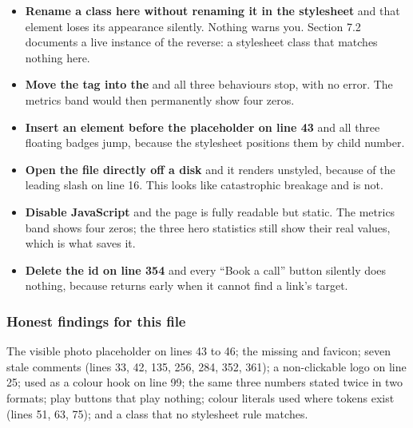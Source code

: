 \begin{itemize}
\item \textbf{Rename a class here without renaming it in the stylesheet} and that
  element loses its appearance silently. Nothing warns you. Section 7.2 documents a
  live instance of the reverse: a stylesheet class that matches nothing here.
\item \textbf{Move the  tag into the } and all three
  behaviours stop, with no error. The metrics band would then permanently show four
  zeros.
\item \textbf{Insert an element before the placeholder on line 43} and all three
  floating badges jump, because the stylesheet positions them by child number.
\item \textbf{Open the file directly off a disk} and it renders unstyled, because of
  the leading slash on line 16. This looks like catastrophic breakage and is not.
\item \textbf{Disable JavaScript} and the page is fully readable but static. The
  metrics band shows four zeros; the three hero statistics still show their real
  values, which is what saves it.
\item \textbf{Delete the id on line 354} and every ``Book a call'' button silently
  does nothing, because  returns early when it cannot find a link's
  target.
\end{itemize}

\subsubsection*{Honest findings for this file}

The visible photo placeholder on lines 43 to 46; the missing  and
favicon; seven stale comments (lines 33, 42, 135, 256, 284, 352, 361); a
non-clickable logo on line 25;  used as a colour hook on line 99; the
same three numbers stated twice in two formats; play buttons that play nothing;
colour literals used where tokens exist (lines 51, 63, 75); and a
 class that no stylesheet rule matches.
